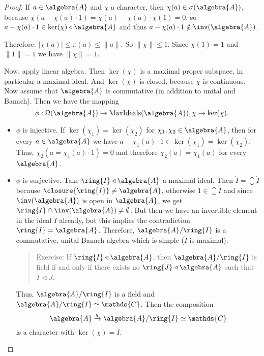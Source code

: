 \documentclass[a4paper]{article}
\begin{document}
\begin{proof}
	If $a \in \algebra{A}$ and $\chi$ a character, then $\chi(a) \in \sigma(\algebra{A})$, because $\chi(a - \chi(a) \cdot 1) = \chi(a) - \chi(a) \cdot \chi(1) = 0$, so $a - \chi(a) \cdot 1 \in \ker(\chi) \triangleleft \algebra{A}$ and thus $a - \chi(a) \cdot 1 \notin \inv(\algebra{A})$.

	Therefore: $|\chi(a)| \leq \pi(a) \leq \|a\|$. So $\|\chi\| \leq 1$. Since $\chi(1) = 1$ and $\|1\| = 1$ we have $\|\chi\| = 1$.

	Now, apply linear algebra. Then $\ker (\chi)$ is a maximal proper subspace, in particular a maximal ideal.
	And $\ker(\chi)$ is closed, because $\chi$ is continuous.
	Now assume that $\algebra{A}$ is commutative (in addition to unital and Banach).
	Then we have the mapping 
	\begin{equation*}
		\phi: \Omega(\algebra{A}) \to \mathrm{MaxIdeals}(\algebra{A}), \chi \to \ker(\chi)\text{.}
	\end{equation*}
	\begin{itemize}
		\item $\phi$ is injective.
		If $\ker(\chi_1) = \ker(\chi_2)$ for $\chi_1, \chi_2 \in \algebra{A}$, then for every $a \in \algebra{A}$ we have $a - \chi_1(a) \cdot 1 \in \ker(\chi_1) =\ker(\chi_2)$.
		Thus, $\chi_2(a = \chi_1(a) \cdot 1) = 0$ and therefore $\chi_2(a) = \chi_1(a)$ for every $\algebra{A}$. 
		\item $\phi$ is surjective.
		Take $\ring{I} \triangleleft  \algebra{A}$ a maximal ideal.
		Then $\ring{I} = \closure{\ring{I}}$ because $\closure{\ring{I}} \neq \algebra{A}$, otherwise $1 \in \closure{\ring{I}}$ and since $\inv(\algebra{A})$ is open in $\algebra{A}$, we get $\ring{I} \cap \inv(\algebra{A}) \neq \emptyset$.
		But then we have an invertible element in the ideal $\ring{I}$ already, but this implies the contradiction $\ring{I} = \algebra{A}$. 
		Therefore, $\algebra{A} / \ring{I}$ is a commutative, unital Banach algebra which is simple ($\ring{I}$ is maximal).
		\begin{quote}
			Exercise: If $\ring{I} \triangleleft \algebra{A}$, then $\algebra{A} / \ring{I}$ is field if and only if there exists no $\ring{J} \triangleleft \algebra{A}$ such that $\ring{I} \triangleleft \ring{J}$.
		\end{quote}
		Thus, $\algebra{A} / \ring{I}$ is a field and $\algebra{A} / \ring{I} \simeq \mathds{C}$.
		Then the composition
		\begin{equation*}
			\algebra{A} \xrightarrow{q} \algebra{A} / \ring{I} \simeq \mathds{C}
		\end{equation*}
		is a character with $ \ker(\chi) = \ring{I}$.
	\end{itemize}
\end{proof}
\end{document}
